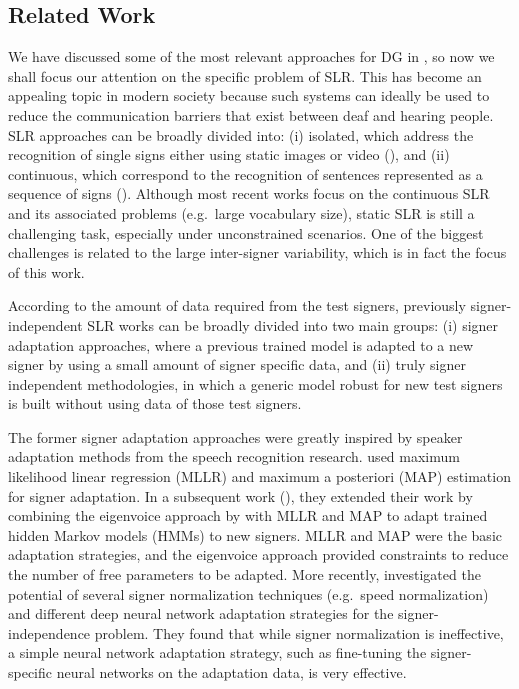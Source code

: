 \subsection{Related Work}
\label{sec:adv_signer_inv_rel_work}
We have discussed some of the most relevant approaches for DG in , so now we shall focus our attention on the specific problem of SLR. This has become an appealing topic in modern society because such systems can ideally be used to reduce the communication barriers that exist between deaf and hearing people.
SLR approaches can be broadly divided into: (i) isolated, which address the recognition of single signs either using static images or video (\citet{Marin2014, Marin2016}), and (ii) continuous, which correspond to the recognition of sentences represented as a sequence of signs (\citet{DanGuo2017, DanGuo2018, Wang2018}). Although most recent works focus on the continuous SLR and its associated problems (e.g.\ large vocabulary size), static SLR is still a challenging task, especially under unconstrained scenarios. One of the biggest challenges is related to the large inter-signer variability, which is in fact the focus of this work.

According to the amount of data required from the test signers, previously signer-independent SLR works can be broadly divided into two main groups: (i) signer adaptation approaches, where a previous trained model is adapted to a new signer by using a small amount of signer specific data, and (ii) truly signer independent methodologies, in which a generic model robust for new test signers is built without using data of those test signers.

The former signer adaptation approaches were greatly inspired by speaker adaptation methods from the speech recognition research. \citet{Agris2006} used maximum likelihood linear regression (MLLR) and maximum a posteriori (MAP) estimation for signer adaptation. In a subsequent work (\citet{Agris2008a}), they extended their work by combining the eigenvoice approach by \citet{Kuhn2000} with MLLR and MAP to adapt trained hidden Markov models (HMMs) to new signers. MLLR and MAP were the basic adaptation strategies, and the eigenvoice approach provided constraints to reduce the number of free parameters to be adapted. More recently, \citet{Kim2016} investigated the potential of several signer normalization techniques (e.g.\ speed normalization) and different deep neural network adaptation strategies for the signer-independence problem. They found that while signer normalization is ineffective, a simple neural network adaptation strategy, such as fine-tuning the signer-specific neural networks on the adaptation data, is very effective.

